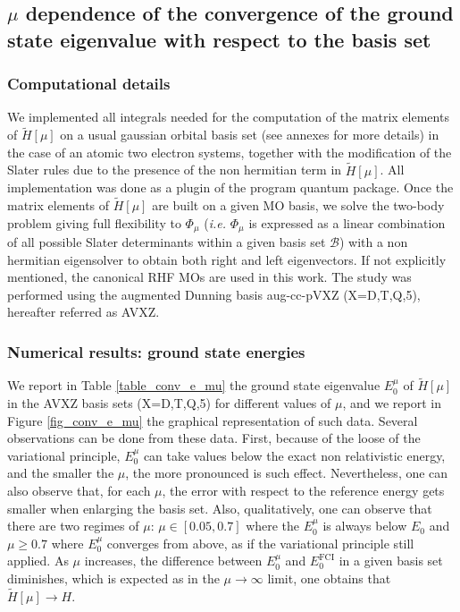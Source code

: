 \documentclass[aip,jcp,reprint,noshowkeys,superscriptaddress]{revtex4-1}
\newcommand{\basis}[0]{\mathcal{B}}
\begin{document}
\subsection{$\mu$ dependence of the convergence of the ground state eigenvalue with respect to the basis set }
\subsubsection{Computational details}
We implemented all integrals needed for the computation of the matrix elements of $\tilde{H}[\mu]$ on a usual gaussian orbital basis set (see annexes for more details) in the case of an atomic two electron systems, together with the modification of the Slater rules due to the presence of the non hermitian term in $\tilde{H}[\mu]$. 
All implementation was done as a plugin of the program quantum package\cite{QP2}. 
Once the matrix elements of $\tilde{H}[\mu]$ are built on a given MO basis, we solve the two-body problem giving full flexibility to $\Phi_\mu$ (\textit{i.e.} $\Phi_\mu$ is expressed as a linear combination of all possible Slater determinants within a given basis set $\basis$) with a non hermitian eigensolver to obtain both right and left eigenvectors. If not explicitly mentioned, the canonical RHF MOs are used in this work. 
The study was performed using the augmented Dunning basis aug-cc-pVXZ (X=D,T,Q,5), hereafter referred as AVXZ. 

\subsubsection{Numerical results: ground state energies}
\label{sec:total_e}
We report in Table \ref{table_conv_e_mu} the ground state eigenvalue $E_0^\mu$ of $\tilde{H}[\mu]$ in the AVXZ basis sets (X=D,T,Q,5) for different values of $\mu$, and we report in Figure \ref{fig_conv_e_mu} the graphical representation of such data. 
Several observations can be done from these data. First, because of the loose of the variational principle, $E_0^{\mu}$ can take values below the exact non relativistic energy, and the smaller the $\mu$, the more pronounced is such effect. 
Nevertheless, one can also observe that, for each $\mu$, the error with respect to the reference energy gets smaller  
when enlarging the basis set. Also, qualitatively, one can observe that there are two regimes of $\mu$: $\mu \in[0.05,0.7]$ where the $E_0^\mu$ is always below $E_0$ and $\mu\ge 0.7$ where $E_0^\mu$ converges from above, as if the variational principle still applied. 
As $\mu$ increases, the difference between $E_0^\mu$ and $E_0^\text{FCI}$ in a given basis set diminishes, 
which is expected as in the $\mu \rightarrow \infty$ limit, one obtains that  $\tilde{H}[\mu] \rightarrow H$. 
\end{document}
